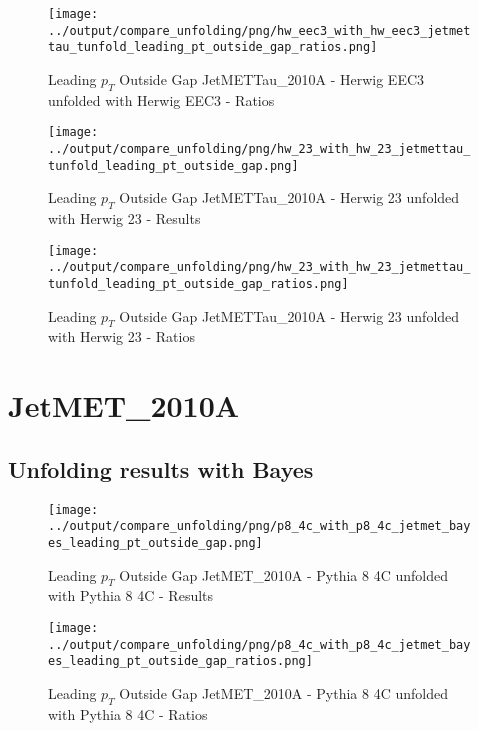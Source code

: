 \documentclass[11pt]{book}
\begin{document}
\begin{figure}[ht]
\centering
\texttt{[image: ../output/compare\_unfolding/png/hw\_eec3\_with\_hw\_eec3\_jetmettau\_tunfold\_leading\_pt\_outside\_gap\_ratios.png]}
\caption{Leading $p_{T}$ Outside Gap JetMETTau\_2010A - Herwig EEC3 unfolded with Herwig EEC3 - Ratios}
\label{hw_eec3_hw_eec3_jetmettau_tunfold_leading_pt_outside_gap_b}
\end{figure}

\begin{figure}[ht]
\centering
\texttt{[image: ../output/compare\_unfolding/png/hw\_23\_with\_hw\_23\_jetmettau\_tunfold\_leading\_pt\_outside\_gap.png]}
\caption{Leading $p_{T}$ Outside Gap JetMETTau\_2010A - Herwig 23 unfolded with Herwig 23 - Results}
\label{hw_23_hw_23_jetmettau_tunfold_leading_pt_outside_gap_a}
\end{figure}

\begin{figure}[ht]
\centering
\texttt{[image: ../output/compare\_unfolding/png/hw\_23\_with\_hw\_23\_jetmettau\_tunfold\_leading\_pt\_outside\_gap\_ratios.png]}
\caption{Leading $p_{T}$ Outside Gap JetMETTau\_2010A - Herwig 23 unfolded with Herwig 23 - Ratios}
\label{hw_23_hw_23_jetmettau_tunfold_leading_pt_outside_gap_b}
\end{figure}

\clearpage
\section{JetMET\_2010A}
\subsection{Unfolding results with Bayes}

\begin{figure}[ht]
\centering
\texttt{[image: ../output/compare\_unfolding/png/p8\_4c\_with\_p8\_4c\_jetmet\_bayes\_leading\_pt\_outside\_gap.png]}
\caption{Leading $p_{T}$ Outside Gap JetMET\_2010A - Pythia 8 4C unfolded with Pythia 8 4C - Results}
\label{p8_p8_jetmet_bayes_leading_pt_outside_gap_a}
\end{figure}

\begin{figure}[ht]
\centering
\texttt{[image: ../output/compare\_unfolding/png/p8\_4c\_with\_p8\_4c\_jetmet\_bayes\_leading\_pt\_outside\_gap\_ratios.png]}
\caption{Leading $p_{T}$ Outside Gap JetMET\_2010A - Pythia 8 4C unfolded with Pythia 8 4C - Ratios}
\label{p8_p8_jetmet_bayes_leading_pt_outside_gap_b}
\end{figure}
\end{document}
